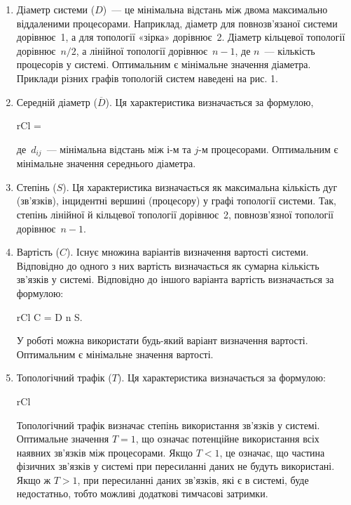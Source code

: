\documentclass[
	a4paper,
	oneside,
	BCOR = 10mm,
	DIV = 12,
	12pt,
	headings = normal,
]{scrartcl}
\begin{document}
		\begin{enumerate}
			\item Діаметр системи ($D$)~— це мінімальна відстань між двома максимально віддаленими процесорами. Наприклад, діаметр для повнозв’язаної системи дорівнює~1, а для топології «зірка» дорівнює~2. Діаметр кільцевої топології дорівнює~$n/2$, а лінійної топології дорівнює~$n - 1$, де $n$~— кількість процесорів у системі. Оптимальним є мінімальне значення діаметра. Приклади різних графів топологій систем наведені на рис. 1.
			\item Середній діаметр ($\overline{D}$). Ця характеристика визначається за формулою,
				\begin{IEEEeqnarray}{rCl}
					 = 
				\end{IEEEeqnarray}
				де~$d_{ij}$~— мінімальна відстань між $і$-м та $j$-м процесорами. Оптимальним є мінімальне значення середнього діаметра.
			\item Степінь ($S$). Ця характеристика визначається як максимальна кількість дуг (зв'язків), інцидентні вершині (процесору) у графі топології системи. Так, степінь лінійної й кільцевої топології дорівнює~2, повнозв’язної топології дорівнює~$n - 1$.
			\item Вартість ($C$). Існує множина варіантів визначення вартості системи. Відповідно до одного з них вартість визначається як сумарна кількість зв'язків у системі. Відповідно до іншого варіанта вартість визначається за формулою:
				\begin{IEEEeqnarray}{rCl}
					C = D n S.
				\end{IEEEeqnarray}
				У роботі можна використати будь-який варіант визначення вартості. Оптимальним є мінімальне значення вартості.
			\item Топологічний трафік ($T$).	Ця характеристика визначається за формулою:
				\begin{IEEEeqnarray}{rCl}
				\end{IEEEeqnarray}
				Топологічний трафік визначає степінь використання зв'язків у системі. Оптимальне значення $T = 1$, що означає потенційне використання всіх наявних зв'язків між процесорами. Якщо $T < 1$, це означає, що частина фізичних зв'язків у системі при пересиланні даних не будуть використані. Якщо ж $T > 1$, при пересиланні даних зв'язків, які є в системі, буде недостатньо, тобто можливі додаткові тимчасові затримки.
		\end{enumerate}
\end{document}
